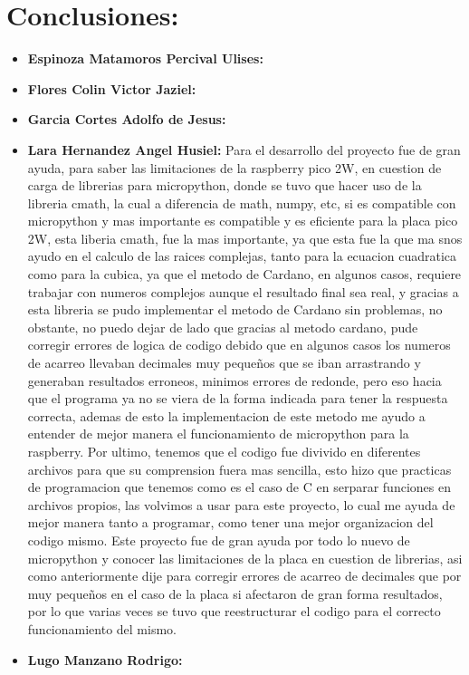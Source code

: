 \documentclass[letterpaper,12pt]{article}
\begin{document}
    \newpage
    \section{Conclusiones:}

    \begin{itemize}
        \item \textbf{Espinoza Matamoros Percival Ulises:} 
        
        \item \textbf{Flores Colin Victor Jaziel:}

        \item \textbf{Garcia Cortes Adolfo de Jesus:}

        \item \textbf{Lara Hernandez Angel Husiel:}
        Para el desarrollo del proyecto fue de gran ayuda, para saber las limitaciones de la raspberry pico 2W, en cuestion de carga de librerias para micropython, donde se tuvo que hacer uso de la libreria cmath, la cual a diferencia de math, numpy, etc, si es compatible con micropython y mas importante
        es compatible y es eficiente para la placa pico 2W, esta liberia cmath, fue la mas importante, ya que esta fue la que ma snos ayudo en el calculo de las raices complejas, tanto para la ecuacion cuadratica como para la cubica, ya que el metodo de Cardano,
        en algunos casos, requiere trabajar con numeros complejos aunque el resultado final sea real, y gracias a esta libreria se pudo implementar el metodo de Cardano sin problemas, no obstante, no puedo dejar de lado que gracias al metodo cardano, pude corregir errores de logica de codigo 
        debido que en algunos casos los numeros de acarreo llevaban decimales muy pequeños que se iban arrastrando y generaban resultados erroneos, minimos errores de redonde, pero eso hacia que el programa ya no se viera de la forma indicada para tener la respuesta correcta,
        ademas de esto la implementacion de este metodo me ayudo a entender de mejor manera el funcionamiento de micropython para la raspberry. Por ultimo, tenemos que el codigo fue divivido en diferentes archivos para que su comprension fuera mas sencilla, 
        esto hizo que practicas de programacion que tenemos como es el caso de C en serparar funciones en archivos propios, las volvimos a usar para este proyecto, lo cual me ayuda de mejor manera tanto a programar, como tener una mejor organizacion del codigo mismo.
        Este proyecto fue de gran ayuda por todo lo nuevo de micropython y conocer las limitaciones de la placa en cuestion de librerias, asi como anteriormente dije para corregir errores de acarreo de decimales que por muy pequeños en el caso de la placa 
        si afectaron de gran forma resultados, por lo que varias veces se tuvo que reestructurar el codigo para el correcto funcionamiento del mismo.

        \item \textbf{Lugo Manzano Rodrigo:}
        
    \end{itemize}

    \newpage

    \nocite{*}
    \printbibliography[heading=bibintoc, title={Referencias}]
\end{document}
